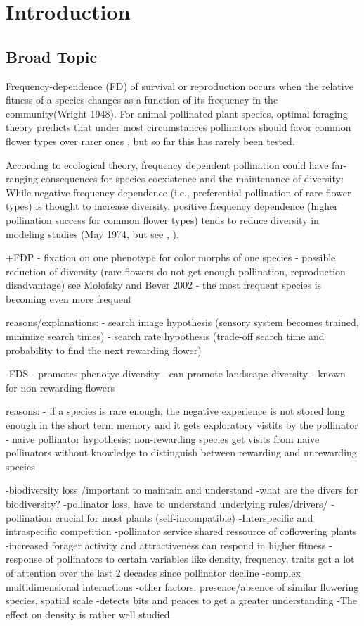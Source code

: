 \section{Introduction}


\subsection*{Broad Topic}

Frequency-dependence (FD) of survival or reproduction occurs when the relative fitness of a species changes as a function of its frequency in the community(Wright 1948). For animal-pollinated plant species, optimal foraging theory predicts that under most circumstances pollinators should favor common flower types over rarer ones \citep{kunin1996pollinator} , but so far this has rarely been tested. 

According to ecological theory, frequency dependent pollination could have far-ranging consequences for species coexistence and the maintenance of diversity: While negative frequency dependence (i.e., preferential pollination of rare flower types) is thought to increase diversity, positive frequency dependence (higher pollination success for common flower types) tends to reduce diversity in modeling studies (May 1974, but see \citealt{bever1999dynamics}, \citealt{molofsky2002novel}).


+FDP
- fixation on one phenotype for color morphs of one species
- possible reduction of diversity (rare flowers do not get enough pollination, reproduction disadvantage) see Molofsky and Bever 2002
- the most frequent species is becoming even more frequent

reasons/explanations:
- search image hypothesis (sensory system becomes trained, minimize search times)
- search rate hypothesis (trade-off search time and probability to find the next rewarding flower)

-FDS
- promotes phenotye diversity
- can promote landscape diversity
- known for non-rewarding flowers

reasons:
- if a species is rare enough, the negative experience is not stored long enough in the short term memory and it gets exploratory vistits by the pollinator
- naive pollinator hypothesis: non-rewarding species get visits from naive pollinators without knowledge to distinguish between rewarding and unrewarding species


-biodiversity loss /important to maintain and understand 
-what are the divers for biodiversity?
-pollinator loss, have to understand underlying rules/drivers/
-pollination crucial for most plants (self-incompatible)
-Interspecific and intraspecific competition
-pollinator service shared ressource of coflowering plants
-increased forager activity and attractiveness can respond in higher fitness
-response of pollinators to certain variables like density, frequency, traits got a lot of attention over the last 2 decades since pollinator decline
-complex multidimensional interactions
-other factors: presence/absence of similar flowering species, spatial scale
-detects bits and peaces to get a greater understanding
-The effect on density is rather well studied


